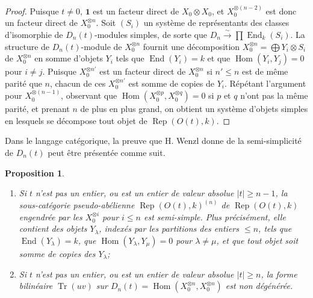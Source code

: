 \documentclass[11pt,a4paper]{article}
\theoremstyle{plain}
\newtheorem{proposition}[theorem]{Proposition}
\theoremstyle{definition}
\DeclareMathOperator{\Hom}{Hom}
\DeclareMathOperator{\End}{End}
\DeclareMathOperator{\Tr}{Tr}
\DeclareMathOperator{\Rep}{Rep}
\newcommand{\isom}{\xrightarrow{\sim}}
\begin{document}
\begin{proof}
Puisque $t \neq 0$, $\mathbf{1}$ est un facteur direct de $X_0 \otimes X_0$, et $X_0^{\otimes (n-2)}$ est donc un facteur direct de $X_0^{\otimes n}$. Soit $(S_i)$ un syst\`eme de repr\'esentants des classes d'isomorphie de $D_n(t)$-modules simples, de sorte que $D_n \isom \prod \End_k(S_i)$. La structure de $D_n(t)$-module de $X_0^{\otimes n}$ fournit une d\'ecomposition $X_0^{\otimes n} = \bigoplus Y_i \otimes S_i$ de $X_0^{\otimes n}$ en somme d'objets $Y_i$ tels que $\End(Y_i) = k$ et que $\Hom(Y_i, Y_j) = 0$ pour $i \neq j$. Puisque $X_0^{\otimes n'}$ est un facteur direct de $X_0^{\otimes n}$ si $n' \leq n$ est de m\^eme parit\'e que $n$, chacun de ces $X_0^{\otimes n'}$ est somme de copies de $Y_i$. R\'ep\'etant l'argument pour $X_0^{\otimes (n-1)}$, observant que $\Hom(X_0^{\otimes p}, X_0^{\otimes q}) = 0$ si $p$ et $q$ n'ont pas la m\^eme parit\'e, et prenant $n$ de plus en plus grand, on obtient un syst\`eme d'objets simples en lesquels se d\'ecompose tout objet de $\Rep(O(t), k)$.
\end{proof}

Dans le langage cat\'egorique, la preuve que H. Wenzl donne de la semi-simplicit\'e de $D_n(t)$ peut \^etre pr\'esent\'ee comme suit.

\begin{proposition}
\begin{enumerate}[label=(\roman*)]
\item Si $t$ n'est pas un entier, ou est un entier de valeur absolue $|t| \geq n - 1$, la sous-cat\'egorie pseudo-ab\'elienne $\Rep(O(t), k)^{(n)}$ de $\Rep(O(t), k)$ engendr\'ee par les $X_0^{\otimes i}$ pour $i \leq n$ est semi-simple. Plus pr\'ecis\'ement, elle contient des objets $Y_\lambda$, index\'es par les partitions des entiers $\leq n$, tels que $\End(Y_\lambda) = k$, que $\Hom(Y_\lambda, Y_\mu) = 0$ pour $\lambda \neq \mu$, et que tout objet soit somme de copies des $Y_\lambda$;
\item Si $t$ n'est pas un entier, ou est un entier de valeur absolue $|t| \geq n$, la forme bilin\'eaire $\Tr(uv)$ sur $D_n(t) = \Hom(X_0^{\otimes n}, X_0^{\otimes n})$ est non d\'eg\'en\'er\'ee.
\end{enumerate}
\end{proposition}
\end{document}
